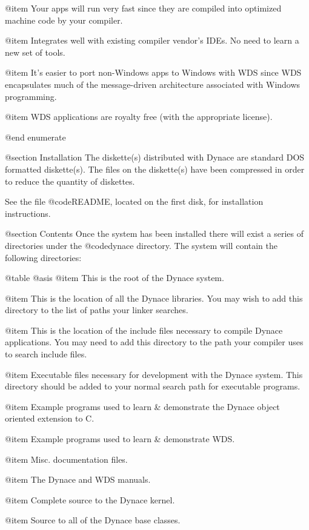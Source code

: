 @item
Your apps will run very fast since they are compiled into optimized
machine code by your compiler.

@item
Integrates well with existing compiler vendor's IDEs.  No need to
learn a new set of tools.

@item
It's easier to port non-Windows apps to Windows with WDS since WDS
encapsulates much of the message-driven architecture associated with
Windows programming.

@item
WDS applications are royalty free (with the appropriate license).

@end enumerate


@section Installation
The diskette(s) distributed with Dynace are standard DOS formatted
diskette(s).  The files on the diskette(s) have been compressed in order
to reduce the quantity of diskettes. 

See the file @code{README}, located on the first disk, for
installation instructions.



@section Contents
Once the system has been installed there will exist a series of
directories under the @code{dynace} directory.  The system will contain
the following directories:


@table @asis
@item \DYNACE
This is the root of the Dynace system.

@item \DYNACE\LIB
This is the location of all the Dynace libraries.  You may wish to add
this directory to the list of paths your linker searches.

@item \DYNACE\INCLUDE
This is the location of the include files necessary to compile Dynace
applications.  You may need to add this directory to the path your
compiler uses to search include files.

@item \DYNACE\BIN
Executable files necessary for development with the Dynace system.
This directory should be added to your normal search path for executable
programs.

@item \DYNACE\EXAMPLES
Example programs used to learn & demonstrate the Dynace object oriented
extension to C.

@item \DYNACE\WINEXAM
Example programs used to learn & demonstrate WDS.

@item \DYNACE\DOCS
Misc. documentation files.

@item \DYNACE\MANUAL
The Dynace and WDS manuals.

@item \DYNACE\KERNAL
Complete source to the Dynace kernel.

@item \DYNACE\CLASS
Source to all of the Dynace base classes.


